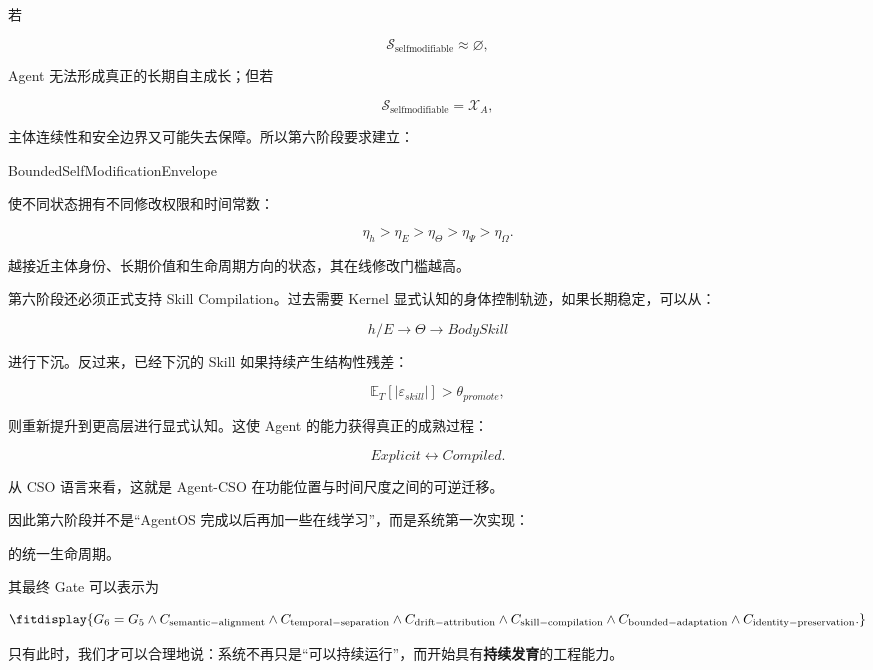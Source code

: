 若

\[
\mathcal S_{\mathrm{selfmodifiable}}
\approx
\varnothing,
\]

Agent 无法形成真正的长期自主成长；但若

\[
\mathcal S_{\mathrm{selfmodifiable}}
=
\mathcal X_A,
\]

主体连续性和安全边界又可能失去保障。所以第六阶段要求建立：

\begin{statementbox}
BoundedSelfModificationEnvelope
\end{statementbox}

使不同状态拥有不同修改权限和时间常数：

\[
\eta_h
>
\eta_E
>
\eta_\Theta
>
\eta_\Psi
>
\eta_\Omega.
\]

越接近主体身份、长期价值和生命周期方向的状态，其在线修改门槛越高。

第六阶段还必须正式支持 Skill Compilation。过去需要 Kernel 显式认知的身体控制轨迹，如果长期稳定，可以从：

\[
h/E
\rightarrow
\Theta
\rightarrow
BodySkill
\]

进行下沉。反过来，已经下沉的 Skill 如果持续产生结构性残差：

\[
\mathbb E_T[|\varepsilon_{skill}|]
>
\theta_{promote},
\]

则重新提升到更高层进行显式认知。这使 Agent 的能力获得真正的成熟过程：

\[
Explicit
\leftrightarrow
Compiled.
\]

从 CSO 语言来看，这就是 Agent-CSO 在功能位置与时间尺度之间的可逆迁移。

因此第六阶段并不是“AgentOS 完成以后再加一些在线学习”，而是系统第一次实现：

\begin{statementbox}
\centering
{}
\end{statementbox}

的统一生命周期。

其最终 Gate 可以表示为

\[
\fitdisplay{
G_6
=
G_5
\land
C_{\mathrm{semantic-alignment}}
\land
C_{\mathrm{temporal-separation}}
\land
C_{\mathrm{drift-attribution}}
\land
C_{\mathrm{skill-compilation}}
\land
C_{\mathrm{bounded-adaptation}}
\land
C_{\mathrm{identity-preservation}}.
}
\]

只有此时，我们才可以合理地说：系统不再只是“可以持续运行”，而开始具有\textbf{持续发育}的工程能力。

